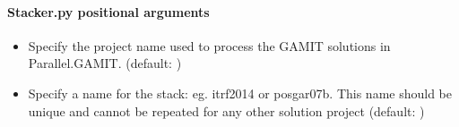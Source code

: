 \documentclass[letterpaper,10pt,english]{sphinxmanual}
\begin{document}
\paragraph{Stacker.py positional arguments}
\label{\detokenize{stacker:Stacker.py-positional-arguments}}\begin{itemize}
\item {} 
\sphinxAtStartPar
{\hyperref[\detokenize{stacker:Stacker.py-_project-name_}]{}} \sphinxhyphen{} Specify the project name used to process the GAMIT solutions in Parallel.GAMIT. (default: )

\item {} 
\sphinxAtStartPar
{\hyperref[\detokenize{stacker:Stacker.py-_stack-name_}]{}} \sphinxhyphen{} Specify a name for the stack: eg. itrf2014 or posgar07b. This name should be unique and cannot be repeated for any other solution project (default: )

\end{itemize}
\end{document}
